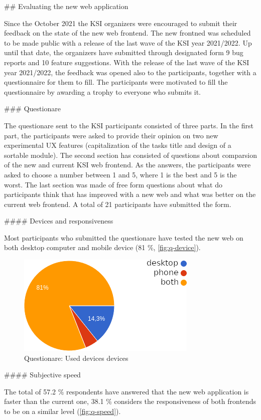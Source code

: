 \documentclass[
  digital, %
  oneside, %
  lof,     %
  nolot,     %
]{fithesis4}
\begin{document}
{## Evaluating the new web application

Since the October 2021 the KSI organizers were encouraged to submit their feedback on the state of the new web frontend. The new frontned was scheduled to be made public with a release of the last wave of the KSI year 2021/2022. Up until that date, the organizers have submitted through designated form 9 bug reports and 10 feature suggestions. With the release of the last wave of the KSI year 2021/2022, the feedback was opened also to the participants, together with a questionnaire for them to fill. The participants were motivated to fill the questionnaire by awarding a trophy to everyone who submits it.

### Questionare

The questionare sent to the KSI participants consisted of three parts. In the first part, the participants were asked to provide their opinion on two new experimental UX features (capitalization of the tasks title and design of a sortable module). The second section has consisted of questions about comparsion of the new and current KSI web frontend. As the answers, the participants were asked to choose a number between 1 and 5, where 1 is the best and 5 is the worst. The last section was made of free form questions about what do participants think that has improved with a new web and what was better on the current web frontend. A total of 21 participants have submitted the form.

#### Devices and responsiveness

Most participants who submitted the questionare have tested the new web on both desktop computer and mobile device (81 \%, \autoref{fig:q-device}).

\begin{figure}
\includegraphics[width=.5\textwidth]{assets/img/questionare/device}
\caption{Questionare: Used devices devices}
\label{fig:q-device}
\end{figure}


#### Subjective speed

The total of 57.2 \% respondents have answered that the new web application is faster than the current one, 38.1 \% considers the responsiveness of both frontends to be on a similar level (\autoref{fig:q-speed}).

}
\end{document}
